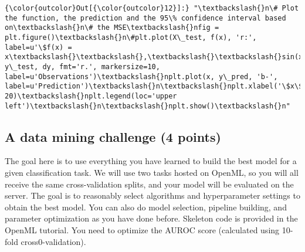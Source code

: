 \documentclass[11pt]{article}
\begin{document}
\begin{Verbatim}[commandchars=\\\{\}]
{\color{outcolor}Out[{\color{outcolor}12}]:} "\textbackslash{}n\# Plot the function, the prediction and the 95\% confidence interval based on\textbackslash{}n\# the MSE\textbackslash{}nfig = plt.figure()\textbackslash{}n\#plt.plot(X\_test, f(x), 'r:', label=u'\$f(x) = x\textbackslash{}\textbackslash{},\textbackslash{}\textbackslash{}sin(x)\$')\textbackslash{}nplt.errorbar(X\_train.ravel(), y\_test, dy, fmt='r.', markersize=10, label=u'Observations')\textbackslash{}nplt.plot(x, y\_pred, 'b-', label=u'Prediction')\textbackslash{}n\textbackslash{}nplt.xlabel('\$x\$')\textbackslash{}nplt.ylabel('\$f(x)\$')\textbackslash{}nplt.ylim(-10, 20)\textbackslash{}nplt.legend(loc='upper left')\textbackslash{}n\textbackslash{}nplt.show()\textbackslash{}n"
\end{Verbatim}
            
    \subsection{A data mining challenge (4
points)}\label{a-data-mining-challenge-4-points}

    The goal here is to use everything you have learned to build the best
model for a given classification task. We will use two tasks hosted on
OpenML, so you will all receive the same cross-validation splits, and
your model will be evaluated on the server. The goal is to reasonably
select algorithms and hyperparameter settings to obtain the best model.
You can also do model selection, pipeline building, and parameter
optimization as you have done before. Skeleton code is provided in the
OpenML tutorial. You need to optimize the AUROC score (calculated using
10-fold cross0-validation).
\end{document}
